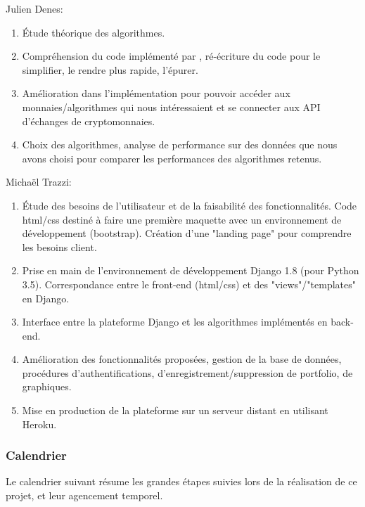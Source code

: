 \documentclass[a4paper, 10pt]{article}
\begin{document}
\noindent Julien Denes:
\begin{enumerate}
    \item Étude théorique des algorithmes.
    \item Compréhension du code implémenté par \citet{Jiang2017}, ré-écriture du code pour le simplifier, le rendre plus rapide, l’épurer.
    \item Amélioration dans l’implémentation pour pouvoir accéder aux monnaies/algorithmes qui nous intéressaient et se connecter aux API d’échanges de cryptomonnaies.
    \item Choix des algorithmes, analyse de performance sur des données que nous avons choisi pour comparer les performances des algorithmes retenus.
\end{enumerate}
\vspace{0.25cm}
\noindent Michaël Trazzi:
\begin{enumerate}
    \item Étude des besoins de l’utilisateur et de la faisabilité des fonctionnalités. Code html/css destiné à faire une première maquette avec un environnement de développement (bootstrap). Création d’une "landing page" pour comprendre les besoins client.
    \item Prise en main de l’environnement de développement Django 1.8 (pour Python 3.5). Correspondance entre le front-end (html/css) et des "views"/"templates" en Django.
    \item Interface entre la plateforme Django et les algorithmes implémentés en back-end.
    \item Amélioration des fonctionnalités proposées, gestion de la base de données, procédures d’authentifications, d’enregistrement/suppression de portfolio, de graphiques.
    \item Mise en production de la plateforme sur un serveur distant en utilisant Heroku.
\end{enumerate}

\subsubsection{Calendrier}
\label{sec:developpement_orga_calendrier}

Le calendrier suivant résume les grandes étapes suivies lors de la réalisation de ce projet, et leur agencement temporel.
\end{document}
